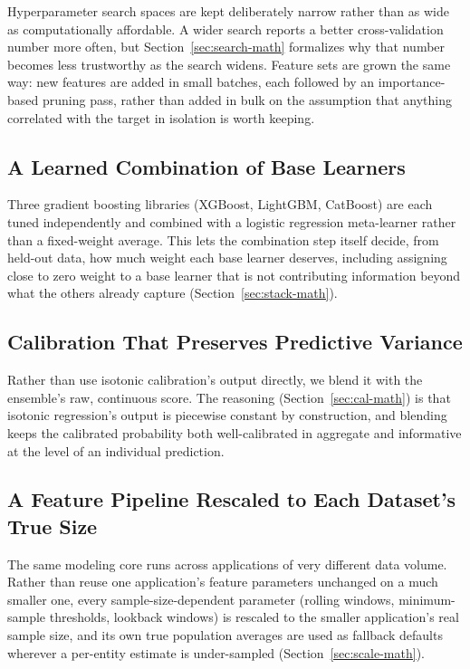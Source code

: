 \documentclass[conference]{IEEEtran}
\begin{document}
Hyperparameter search spaces are kept deliberately narrow rather than
as wide as computationally affordable. A wider search reports a better
cross-validation number more often, but Section~\ref{sec:search-math}
formalizes why that number becomes less trustworthy as the search
widens. Feature sets are grown the same way: new features are added in
small batches, each followed by an importance-based pruning pass,
rather than added in bulk on the assumption that anything correlated
with the target in isolation is worth keeping.

\subsection{A Learned Combination of Base Learners}
\label{sec:stack-strategy}

Three gradient boosting libraries (XGBoost, LightGBM, CatBoost) are
each tuned independently and combined with a logistic regression
meta-learner rather than a fixed-weight average. This lets the
combination step itself decide, from held-out data, how much weight
each base learner deserves, including assigning close to zero weight
to a base learner that is not contributing information beyond what the
others already capture (Section~\ref{sec:stack-math}).

\subsection{Calibration That Preserves Predictive Variance}
\label{sec:cal-strategy}

Rather than use isotonic calibration's output directly, we blend it
with the ensemble's raw, continuous score. The reasoning
(Section~\ref{sec:cal-math}) is that isotonic regression's output is
piecewise constant by construction, and blending keeps the calibrated
probability both well-calibrated in aggregate and informative at the
level of an individual prediction.

\subsection{A Feature Pipeline Rescaled to Each Dataset's True Size}
\label{sec:scale-strategy}

The same modeling core runs across applications of very different
data volume. Rather than reuse one application's feature parameters
unchanged on a much smaller one, every sample-size-dependent parameter
(rolling windows, minimum-sample thresholds, lookback windows) is
rescaled to the smaller application's real sample size, and its own
true population averages are used as fallback defaults wherever a
per-entity estimate is under-sampled (Section~\ref{sec:scale-math}).
\end{document}
